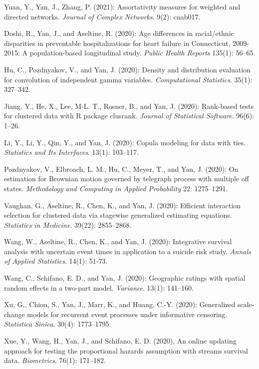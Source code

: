 \documentclass[Statistics]{vita}
\begin{document}
\begin{vita}
\begin{Publications}
\begin{RefereedJournalArticles}
  \item *Yuan, Y., Yan, J., Zhang, P. (2021): Assortativity measures for weighted and directed networks. {\em Journal of Complex Networks\/}. 9(2): cnab017. 
  \item *Doshi, R., Yan, J., and Aseltine, R. (2020): Age differences in racial/ethnic disparities in preventable hospitalizations for heart failure in Connecticut, 2009-2015: A population-based longitudinal study. {\em Public Health Reports\/} 135(1): 56--65.
  \item *Hu, C., Pozdnyakov, V., and Yan, J. (2020): Density and distribution evaluation for convolution of independent gamma variables. {\em Computational Statistics\/}. 35(1): 327--342.
  \item *Jiang, Y., He, X., Lee, M-L. T., Rosner, B., and Yan, J. (2020): Rank-based tests for clustered data with R package clusrank. {\em Journal of Statistical Software\/}. 96(6): 1--26.
  \item *Li, Y., Li, Y., Qin, Y., and Yan, J. (2020): Copula modeling for data with ties.  {\em Statistics and Its Interfaces\/}. 13(1): 103--117.
  \item Pozdnyakov, V., Elbroach, L. M., Hu, C., Meyer, T., and Yan, J. (2020): On estimation for Brownian motion governed by telegraph process with multiple off states. {\em Methodology and Computing in Applied Probability\/} 22: 1275--1291.
  \item *Vaughan, G., Aseltine, R., Chen, K., and Yan, J. (2020): Efficient interaction selection for clustered data via stagewise generalized estimating equations. {\em Statistics in Medicine\/}. 39(22): 2855--2868.
  \item *Wang, W., Aseltine, R., Chen, K., and Yan, J. (2020): Integrative survival analysis with uncertain event times in application to a suicide risk study. {\em Annals of Applied Statistics\/}. 14(1): 51-73.      
  \item *Wang, C., Schifano, E. D., and Yan, J. (2020): Geographic ratings with spatial random effects in a two-part model. {\em Variance\/}. 13(1): 141--160.
  \item Xu, G., Chiou, S., Yan, J., Marr, K., and Huang, C.-Y. (2020): Generalized scale-change models for recurrent event processes under informative censoring. {\em Statistica Sinica\/}. 30(4): 1773--1795.
  \item *Xue, Y., Wang, H., Yan, J., and Schifano, E. D. (2020), An online updating approach for testing the proportional hazards assumption with streams survival data. {\em Biometrics\/}. 76(1): 171--182.

\end{RefereedJournalArticles}
\end{Publications}
\end{vita}
\end{document}
